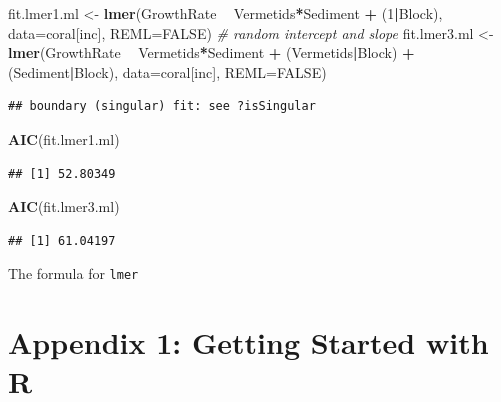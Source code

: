 \documentclass[]{book}
\newenvironment{Shaded}{\begin{snugshade}}{\end{snugshade}}
\newcommand{\KeywordTok}[1]{\textcolor[rgb]{0.13,0.29,0.53}{\textbf{#1}}}
\newcommand{\DataTypeTok}[1]{\textcolor[rgb]{0.13,0.29,0.53}{#1}}
\newcommand{\DecValTok}[1]{\textcolor[rgb]{0.00,0.00,0.81}{#1}}
\newcommand{\StringTok}[1]{\textcolor[rgb]{0.31,0.60,0.02}{#1}}
\newcommand{\CommentTok}[1]{\textcolor[rgb]{0.56,0.35,0.01}{\textit{#1}}}
\newcommand{\OtherTok}[1]{\textcolor[rgb]{0.56,0.35,0.01}{#1}}
\newcommand{\OperatorTok}[1]{\textcolor[rgb]{0.81,0.36,0.00}{\textbf{#1}}}
\newcommand{\NormalTok}[1]{#1}
\begin{document}
\begin{Shaded}
\begin{Highlighting}[]
\NormalTok{fit.lmer1.ml <-}\StringTok{ }\KeywordTok{lmer}\NormalTok{(GrowthRate }\OperatorTok{~}\StringTok{ }\NormalTok{Vermetids}\OperatorTok{*}\NormalTok{Sediment }\OperatorTok{+}\StringTok{ }\NormalTok{(}\DecValTok{1}\OperatorTok{|}\NormalTok{Block), }\DataTypeTok{data=}\NormalTok{coral[inc], }\DataTypeTok{REML=}\OtherTok{FALSE}\NormalTok{)}
\CommentTok{# random intercept and slope}
\NormalTok{fit.lmer3.ml <-}\StringTok{ }\KeywordTok{lmer}\NormalTok{(GrowthRate }\OperatorTok{~}\StringTok{ }\NormalTok{Vermetids}\OperatorTok{*}\NormalTok{Sediment }\OperatorTok{+}\StringTok{ }\NormalTok{(Vermetids}\OperatorTok{|}\NormalTok{Block) }\OperatorTok{+}\StringTok{ }\NormalTok{(Sediment}\OperatorTok{|}\NormalTok{Block), }\DataTypeTok{data=}\NormalTok{coral[inc], }\DataTypeTok{REML=}\OtherTok{FALSE}\NormalTok{)}
\end{Highlighting}
\end{Shaded}

\begin{verbatim}
## boundary (singular) fit: see ?isSingular
\end{verbatim}

\begin{Shaded}
\begin{Highlighting}[]
\KeywordTok{AIC}\NormalTok{(fit.lmer1.ml)}
\end{Highlighting}
\end{Shaded}

\begin{verbatim}
## [1] 52.80349
\end{verbatim}

\begin{Shaded}
\begin{Highlighting}[]
\KeywordTok{AIC}\NormalTok{(fit.lmer3.ml)}
\end{Highlighting}
\end{Shaded}

\begin{verbatim}
## [1] 61.04197
\end{verbatim}

The formula for \texttt{lmer}

\chapter*{Appendix 1: Getting Started with
R}\label{appendix-1-getting-started-with-r}
\end{document}
